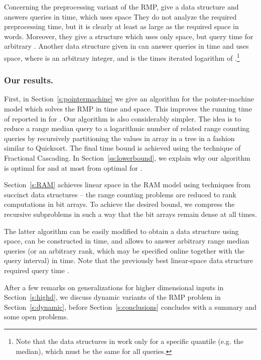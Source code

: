 \documentclass[a4paper,10pt]{article}
\begin{document}
Concerning the preprocessing variant of the RMP,
\cite{DBLP:journals/njc/KrizancMS05} give a data structure and answers queries in  time,
which uses  space
They do not analyze the required preprocessing time, but it is clearly at least as large as the required space in words.
Moreover, they give a structure which uses only  space, but query time  for arbitrary .
 Another data structure given in \cite{DBLP:conf/sofsem/Petersen08a}
can answer queries in  time and uses  space, where  is an arbitrary integer, and  is the  times iterated logarithm of .\footnote{Note that the data structures in \cite{DBLP:journals/njc/KrizancMS05,DBLP:conf/sofsem/Petersen08a} 
work only for a specific quantile (e.g. the median), which must be the same for all queries.}


\subsubsection*{Our results.}
First, in Section~\ref{s:pointermachine} we give an algorithm for the
pointer-machine model which solves the RMP in 
time and  space. This improves the running time of  reported in
\cite{DBLP:conf/esa/Har-PeledM08} for .  Our
algorithm is also considerably simpler.  The idea is to reduce a
range median query to a logarithmic number of related range counting
queries by recursively partitioning the values in array  in a tree
in a fashion similar to Quicksort.  The final time bound is achieved
using the technique of Fractional Cascading.
In Section~\ref{ss:lowerbound}, we explain why our algorithm is optimal for  and at most
 from optimal for .



Section~\ref{s:RAM} achieves linear space in the RAM model using
techniques from succinct data structures -- the range counting
problems are reduced to rank computations in bit arrays. To achieve
the desired bound, we compress the recursive subproblems in such a way
that the bit arrays remain dense at all times.

The latter algorithm can be easily modified to obtain a data structure using  space, can be constructed in  time, and allows to answer arbitrary range median queries (or an arbitrary rank, which may be specified online together with the query interval) in  time. 
Note that the previously best linear-space data structure required  query time \cite{DBLP:journals/njc/KrizancMS05}.


After a few remarks on generalizations for higher dimensional inputs
in Section~\ref{s:highd}, we discuss dynamic variants of the RMP problem in Section~\ref{s:dynamic}, before Section~\ref{s:conclusions} concludes with a
summary and some open problems.
\end{document}
